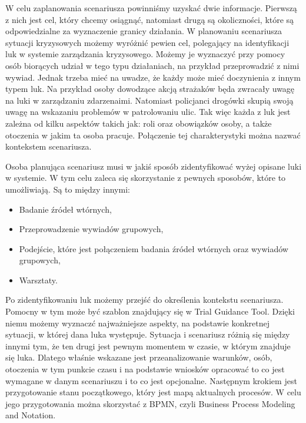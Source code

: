 W celu zaplanowania scenariusza powinniśmy uzyskać dwie informacje. Pierwszą z nich jest cel, który chcemy osiągnąć, natomiast drugą są okoliczności, które są odpowiedzialne za wyznaczenie granicy działania.
W planowaniu scenariusza sytuacji kryzysowych możemy wyróżnić pewien cel, polegający na identyfikacji luk w systemie zarządzania kryzysowego. Możemy je wyznaczyć przy pomocy osób biorących udział w tego typu działaniach, na przykład przeprowadzić z nimi wywiad.
Jednak trzeba mieć na uwadze, że każdy może mieć doczynienia z innym typem luk. Na przykład osoby dowodzące akcją strażaków będa zwracały uwagę na luki w zarządzaniu zdarzenaimi. Natomiast policjanci drogówki skupią swoją uwagę na wskazaniu problemów w patrolowaniu ulic.
Tak więc każda z luk jest zależna od kilku aspektów takich jak: roli oraz obowiązków osoby, a także otoczenia w jakim ta osoba pracuje. Połączenie tej charakterystyki można nazwać kontekstem scenariusza.

Osoba planująca scenariusz musi w jakiś sposób zidentyfikować wyżej opisane luki w systemie. W tym celu zaleca się skorzystanie z pewnych sposobów, które to umożliwiają. Są to między innymi:
\begin{itemize}
\item Badanie źródeł wtórnych,
\item Przeprowadzenie wywiadów grupowych,
\item Podejście, które jest połączeniem badania źródeł wtórnych oraz wywiadów grupowych,
\item Warsztaty.
\end{itemize}

Po zidentyfikowaniu luk możemy przejść do określenia kontekstu scenariusza. Pomocny w tym może być szablon znajdujący się w Trial Guidance Tool. Dzięki niemu możemy wyznaczć najważniejsze aspekty, na podstawie konkretnej sytuacji, w której dana luka występuje. Sytuacja i scenariusz różnią się między innymi tym, że ten drugi jest pewnym momentem w czasie, w którym znajduje się luka. Dlatego właśnie wskazane jest przeanalizowanie warunków, osób, otoczenia w tym punkcie czasu
i na podstawie wniosków opracować to co jest wymagane w danym scenariuszu i to co jest opcjonalne. Następnym krokiem jest przygotowanie stanu początkowego, który jest mapą aktualnych procesów. W celu jego przygotowania można skorzystać z BPMN, czyli Business Process Modeling and Notation.

